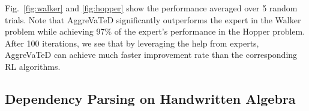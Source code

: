 \documentclass{article}
\begin{document}
Fig.~\ref{fig:walker} and \ref{fig:hopper} show the performance averaged over 5 random trials. Note that AggreVaTeD significantly outperforms the expert in the Walker problem while achieving 97$\%$ of the expert's performance in the Hopper problem. After 100 iterations, we see that by leveraging the help from experts, AggreVaTeD can achieve much faster improvement rate than the corresponding RL algorithms. 


\subsection{Dependency Parsing on Handwritten Algebra}
\begin{table}[t!]
\begin{center}
\end{center}
\vspace{-5pt}
\caption{ Performance (UAS) of different approaches on handwritten algebra dependency parsing. \emph{SL} stands for supervised learning using expert's samples: maximizing the likelihood of expert's actions under the sequences generated by expert itself. \emph{SL-RL} means RL with initialization using SL. \emph{Random} stands for the initial performances of random policies (LSTMs and NN).
The performance of DAgger with Kernel SVM is from \cite{duyckpredicting}.} %
\label{tab:eager}
\end{table}
\end{document}
